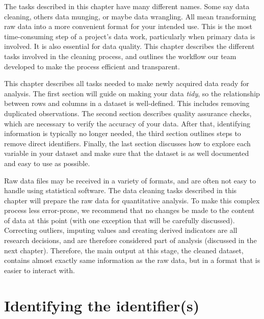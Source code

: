 
\begin{fullwidth}

The tasks described in this chapter have many different names.
Some say data cleaning, others data munging, or maybe data wrangling.
All mean transforming raw data into a more convenient format for your intended use.
This is the most time-consuming step of a project's data work, 
particularly when primary data is involved.
It is also essential for data quality. 
This chapter describes the different tasks involved in the cleaning process,
and outlines the workflow our team developed to make the process efficient and transparent.

This chapter describes all tasks needed to make newly acquired data ready for analysis.
The first section will guide on making your data \textit{tidy},
so the relationship between rows and columns in a dataset is well-defined.
This includes removing duplicated observations.
The second section describes quality assurance checks, 
which are necessary to verify the accuracy of your data.
After that, identifying information is typically no longer needed,
the third section outlines steps to remove direct identifiers.
Finally, the last section discusses how to explore each variable in your dataset and 
make sure that the dataset is as well documented and easy to use as possible.

Raw data files may be received in a variety of formats, 
and are often not easy to handle using statistical software.
The data cleaning tasks described in this chapter will prepare the raw data
for quantitative analysis.
To make this complex process less error-prone,
we recommend that no changes be made to the content of data at this point
(with one exception that will be carefully discussed).
Correcting outliers, imputing values and creating derived indicators
are all research decisions, and are therefore considered part of analysis (discussed in the next chapter).
Therefore, the main output at this stage, the cleaned dataset,
contains almost exactly same information as the raw data,
but in a format that is easier to interact with.  

\end{fullwidth}



\section{Identifying the identifier(s)}

